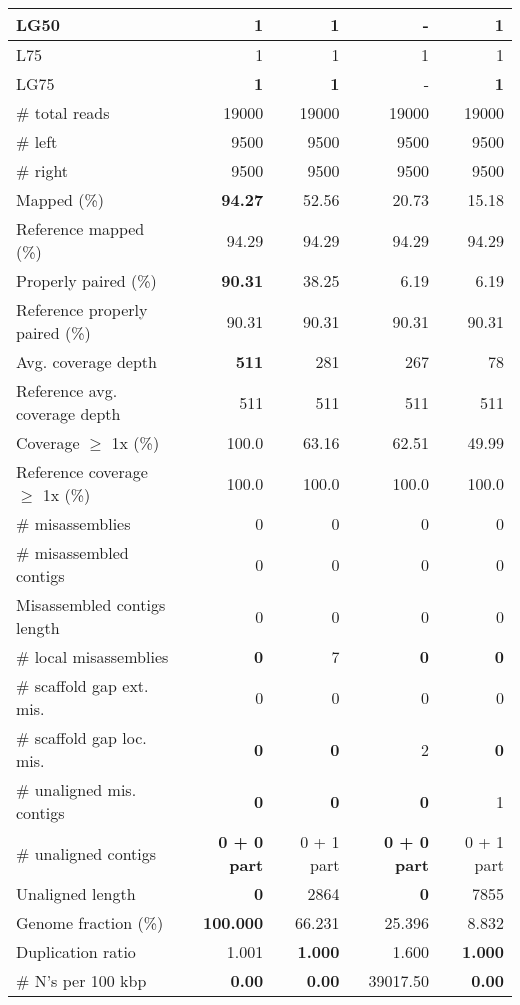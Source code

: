 \documentclass[12pt,a4paper]{article}
\begin{document}
\begin{table}[ht]
\begin{center}
\begin{tabular}{|l*{4}{|r}|}
LG50 & {\bf 1} & {\bf 1} & - & {\bf 1} \\ \hline
L75 & 1 & 1 & 1 & 1 \\ \hline
LG75 & {\bf 1} & {\bf 1} & - & {\bf 1} \\ \hline
\# total reads & 19000 & 19000 & 19000 & 19000 \\ \hline
\# left & 9500 & 9500 & 9500 & 9500 \\ \hline
\# right & 9500 & 9500 & 9500 & 9500 \\ \hline
Mapped (\%) & {\bf 94.27} & 52.56 & 20.73 & 15.18 \\ \hline
Reference mapped (\%) & 94.29 & 94.29 & 94.29 & 94.29 \\ \hline
Properly paired (\%) & {\bf 90.31} & 38.25 & 6.19 & 6.19 \\ \hline
Reference properly paired (\%) & 90.31 & 90.31 & 90.31 & 90.31 \\ \hline
Avg. coverage depth & {\bf 511} & 281 & 267 & 78 \\ \hline
Reference avg. coverage depth & 511 & 511 & 511 & 511 \\ \hline
Coverage $\geq$ 1x (\%) & 100.0 & 63.16 & 62.51 & 49.99 \\ \hline
Reference coverage $\geq$ 1x (\%) & 100.0 & 100.0 & 100.0 & 100.0 \\ \hline
\# misassemblies & 0 & 0 & 0 & 0 \\ \hline
\# misassembled contigs & 0 & 0 & 0 & 0 \\ \hline
Misassembled contigs length & 0 & 0 & 0 & 0 \\ \hline
\# local misassemblies & {\bf 0} & 7 & {\bf 0} & {\bf 0} \\ \hline
\# scaffold gap ext. mis. & 0 & 0 & 0 & 0 \\ \hline
\# scaffold gap loc. mis. & {\bf 0} & {\bf 0} & 2 & {\bf 0} \\ \hline
\# unaligned mis. contigs & {\bf 0} & {\bf 0} & {\bf 0} & 1 \\ \hline
\# unaligned contigs & {\bf 0 + 0 part} & 0 + 1 part & {\bf 0 + 0 part} & 0 + 1 part \\ \hline
Unaligned length & {\bf 0} & 2864 & {\bf 0} & 7855 \\ \hline
Genome fraction (\%) & {\bf 100.000} & 66.231 & 25.396 & 8.832 \\ \hline
Duplication ratio & 1.001 & {\bf 1.000} & 1.600 & {\bf 1.000} \\ \hline
\# N's per 100 kbp & {\bf 0.00} & {\bf 0.00} & 39017.50 & {\bf 0.00} \\ \hline

\end{tabular}
\end{center}
\end{table}
\end{document}
